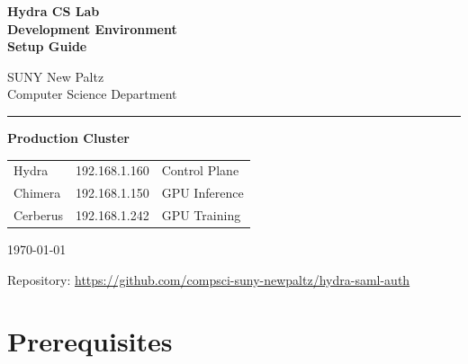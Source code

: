 \documentclass[11pt,a4paper]{article}
\begin{document}
\begin{titlepage}
    \centering
    \vspace*{3cm}

    {\Huge\bfseries\color{sectionblue}
        Hydra CS Lab\\[0.3em]
        Development Environment\\[0.3em]
        Setup Guide
    }

    \vspace{1.5cm}

    {\Large\color{gray}
        SUNY New Paltz\\
        Computer Science Department
    }

    \vspace{2cm}

    \rule{0.6\textwidth}{0.5pt}

    \vspace{1cm}

    {\large
        \textbf{Production Cluster}\\[0.5em]
        \begin{tabular}{l l l}
            Hydra & 192.168.1.160 & Control Plane \\
            Chimera & 192.168.1.150 & GPU Inference \\
            Cerberus & 192.168.1.242 & GPU Training \\
        \end{tabular}
    }

    \vspace{2cm}

    {\large \today}

    \vfill

    {\small
        Repository: \url{https://github.com/compsci-suny-newpaltz/hydra-saml-auth}
    }
\end{titlepage}

\newpage
\tableofcontents
\newpage

\section{Prerequisites}
\label{sec:prerequisites}
\end{document}
